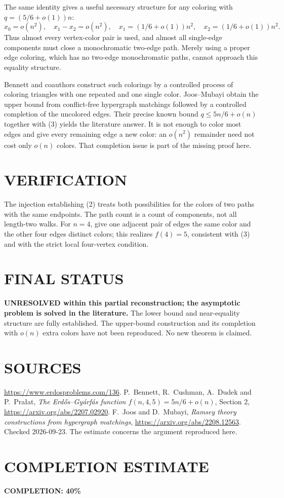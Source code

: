 The same identity gives a useful necessary structure for any coloring
with $q=(5/6+o(1))n$:
\[
 x_0=o(n^2),\quad x_1-x_2=o(n^2),\quad
 x_1=(1/6+o(1))n^2,\quad x_2=(1/6+o(1))n^2.              \tag{4}
\]
Thus almost every vertex-color pair is used, and almost all single-edge
components must close a monochromatic two-edge path. Merely using a
proper edge coloring, which has no two-edge monochromatic paths,
cannot approach this equality structure.

Bennett and coauthors construct such colorings by a controlled process
of coloring triangles with one repeated and one single color.
Joos--Mubayi obtain the upper bound from conflict-free hypergraph
matchings followed by a controlled completion of the uncolored edges.
Their precise known bound $q\le5n/6+o(n)$ together with (3) yields the
literature answer. It is not enough to color most edges and give every
remaining edge a new color: an $o(n^2)$ remainder need not cost only
$o(n)$ colors. That completion issue is part of the missing proof here.

\section{VERIFICATION}
The injection establishing (2) treats both possibilities for the
colors of two paths with the same endpoints. The path count is a count
of components, not all length-two walks. For $n=4$, give one adjacent
pair of edges the same color and the other four edges distinct colors;
this realizes $f(4)=5$, consistent with (3) and with the strict local
four-vertex condition.

\section{FINAL STATUS}
\textbf{UNRESOLVED within this partial reconstruction; the asymptotic
problem is solved in the literature.}
The lower bound and near-equality structure are fully established.
The upper-bound construction and its completion with $o(n)$ extra
colors have not been reproduced. No new theorem is claimed.

\section{SOURCES}
\url{https://www.erdosproblems.com/136}.
P.~Bennett, R.~Cushman, A.~Dudek and P.~Pra\l at,
\emph{The Erd\H{o}s--Gy\'arf\'as function $f(n,4,5)=5n/6+o(n)$},
Section 2, \url{https://arxiv.org/abs/2207.02920}.
F.~Joos and D.~Mubayi, \emph{Ramsey theory constructions from hypergraph
matchings}, \url{https://arxiv.org/abs/2208.12563}.
Checked 2026-09-23. The estimate concerns the argument reproduced here.

\section{COMPLETION ESTIMATE}
\textbf{COMPLETION: 40\%}
